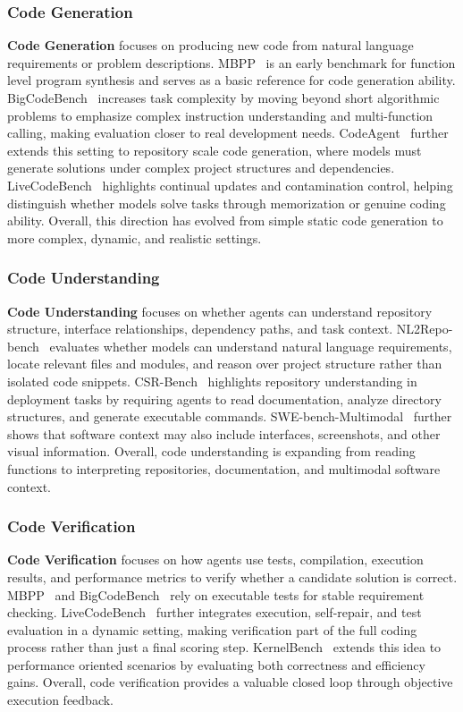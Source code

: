 \documentclass{llmxive}
\begin{document}
\subsubsection{Code Generation}
\label{Code Generation}
\textbf{Code Generation} focuses on producing new code from natural language requirements or problem descriptions. MBPP~\cite{MBPP} is an early benchmark for function level program synthesis and serves as a basic reference for code generation ability. BigCodeBench~\cite{BigCodeBench} increases task complexity by moving beyond short algorithmic problems to emphasize complex instruction understanding and multi-function calling, making evaluation closer to real development needs. CodeAgent~\cite{CodeAgent} further extends this setting to repository scale code generation, where models must generate solutions under complex project structures and dependencies. LiveCodeBench~\cite{LiveCodeBench} highlights continual updates and contamination control, helping distinguish whether models solve tasks through memorization or genuine coding ability. 
Overall, this direction has evolved from simple static code generation to more complex, dynamic, and realistic settings.

\subsubsection{Code Understanding}
\label{Code Understanding}
\textbf{Code Understanding} focuses on whether agents can understand repository structure, interface relationships, dependency paths, and task context. 
NL2Repo-bench~\cite{NL2Repo_Bench} evaluates whether models can understand natural language requirements, locate relevant files and modules, and reason over project structure rather than isolated code snippets.
CSR-Bench~\cite{CSR-Bench} highlights repository understanding in deployment tasks by requiring agents to read documentation, analyze directory structures, and generate executable commands. SWE-bench-Multimodal~\cite{SWE-bench_Multimodal} further shows that software context may also include interfaces, screenshots, and other visual information. 
Overall, code understanding is expanding from reading functions to interpreting repositories, documentation, and multimodal software context.


\subsubsection{Code Verification}
\label{Code Verification}
\textbf{Code Verification} focuses on how agents use tests, compilation, execution results, and performance metrics to verify whether a candidate solution is correct. 
MBPP~\cite{MBPP} and BigCodeBench~\cite{BigCodeBench} rely on executable tests for stable requirement checking. 
LiveCodeBench~\cite{LiveCodeBench} further integrates execution, self-repair, and test evaluation in a dynamic setting, making verification part of the full coding process rather than just a final scoring step. 
KernelBench~\cite{KernelBench} extends this idea to performance oriented scenarios by evaluating both correctness and efficiency gains. 
Overall, code verification provides a valuable closed loop through objective execution feedback.
\end{document}

